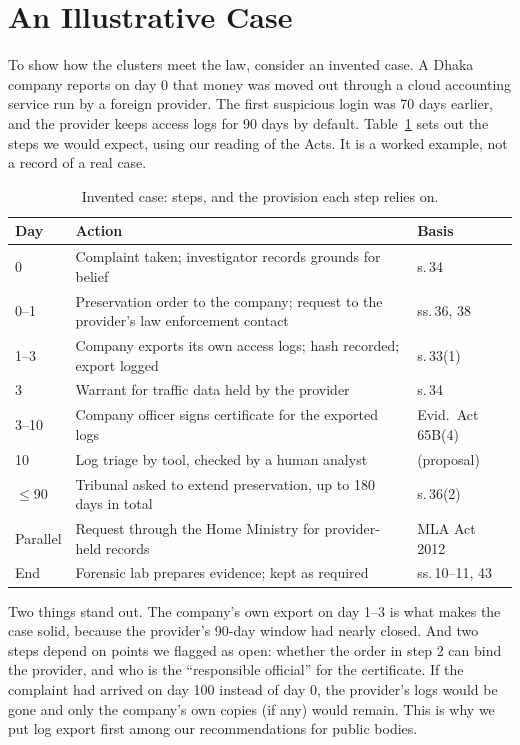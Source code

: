 \documentclass[conference]{IEEEtran}
\begin{document}
\section{An Illustrative Case}
To show how the clusters meet the law, consider an invented case. A Dhaka company reports on day 0 that money was moved out through a cloud accounting service run by a foreign provider. The first suspicious login was 70 days earlier, and the provider keeps access logs for 90 days by default. Table~\ref{tab:case} sets out the steps we would expect, using our reading of the Acts. It is a worked example, not a record of a real case.

\begin{table}[t]
\centering
\caption{Invented case: steps, and the provision each step relies on.}
\label{tab:case}
\small
\renewcommand{\arraystretch}{1.05}
\begin{tabularx}{\columnwidth}{@{}l X l@{}}
\toprule
Day & Action & Basis \\
\midrule
0 & Complaint taken; investigator records grounds for belief & s.\,34 \\
0--1 & Preservation order to the company; request to the provider's law enforcement contact & ss.\,36, 38 \\
1--3 & Company exports its own access logs; hash recorded; export logged & s.\,33(1) \\
3 & Warrant for traffic data held by the provider & s.\,34 \\
3--10 & Company officer signs certificate for the exported logs & Evid.\ Act 65B(4) \\
10 & Log triage by tool, checked by a human analyst & (proposal) \\
$\le$90 & Tribunal asked to extend preservation, up to 180 days in total & s.\,36(2) \\
Parallel & Request through the Home Ministry for provider-held records & MLA Act 2012 \\
End & Forensic lab prepares evidence; kept as required & ss.\,10--11, 43 \\
\bottomrule
\end{tabularx}
\end{table}

Two things stand out. The company's own export on day 1--3 is what makes the case solid, because the provider's 90-day window had nearly closed. And two steps depend on points we flagged as open: whether the order in step 2 can bind the provider, and who is the ``responsible official'' for the certificate. If the complaint had arrived on day 100 instead of day 0, the provider's logs would be gone and only the company's own copies (if any) would remain. This is why we put log export first among our recommendations for public bodies.
\end{document}
